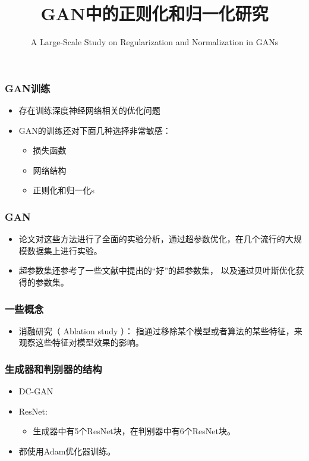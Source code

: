 \documentclass{beamer}
\author{A Large-Scale Study on Regularization and Normalization in GANs}
\title{GAN中的正则化和归一化研究}
\begin{document}
 
\frame{\titlepage}

\begin{frame}[c]\frametitle{GAN训练}
\begin{itemize}
    \item 存在训练深度神经网络相关的优化问题
    \item GAN的训练还对下面几种选择非常敏感：
    \begin{itemize}
        \item 损失函数
        \item 网络结构
        \item 正则化和归一化s
    \end{itemize}

\end{itemize}
\end{frame}

\begin{frame}[c]\frametitle{GAN}
    \begin{itemize}
       \item 论文对这些方法进行了全面的实验分析，通过超参数优化，在几个流行的大规模数据集上进行实验。
       \item 超参数集还参考了一些文献中提出的“好”的超参数集， 以及通过贝叶斯优化获得的参数集。
    \end{itemize}
\end{frame}

\begin{frame}[c]\frametitle{一些概念}
    \begin{itemize}
        \item {\color{red}消融研究（ Ablation study ）}：
        指通过移除某个模型或者算法的某些特征，来观察这些特征对模型效果的影响。
    \end{itemize}
\end{frame}

\begin{frame}[c]\frametitle{生成器和判别器的结构}
    \begin{itemize}
        \item DC-GAN
        \item ResNet: 
        \begin{itemize}
            \item 生成器中有5个ResNet块，在判别器中有6个ResNet块。
        \end{itemize}
        \item 都使用Adam优化器训练。
    \end{itemize}
\end{frame}
\end{document}
